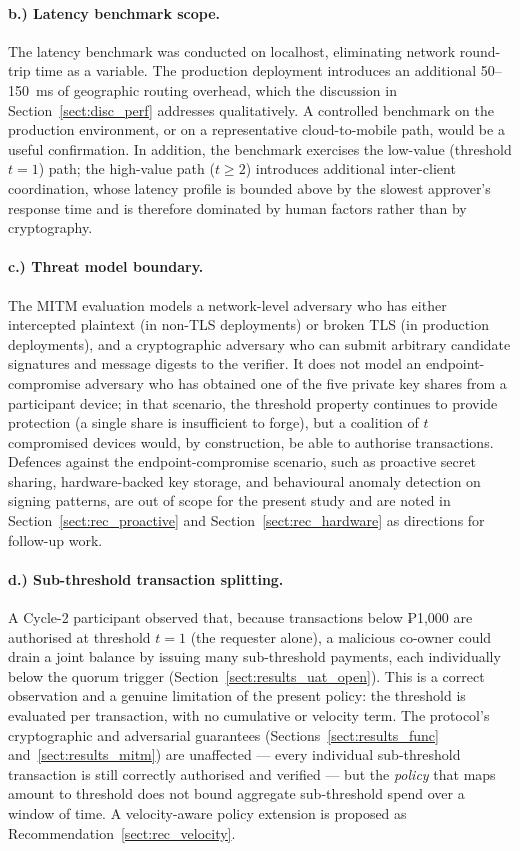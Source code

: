 \paragraph{b.) Latency benchmark scope.}
The latency benchmark was conducted on localhost, eliminating network round-trip time as a variable. The production deployment introduces an additional 50--150~ms of geographic routing overhead, which the discussion in Section~\ref{sect:disc_perf} addresses qualitatively. A controlled benchmark on the production environment, or on a representative cloud-to-mobile path, would be a useful confirmation. In addition, the benchmark exercises the low-value (threshold $t = 1$) path; the high-value path ($t \geq 2$) introduces additional inter-client coordination, whose latency profile is bounded above by the slowest approver's response time and is therefore dominated by human factors rather than by cryptography.

\paragraph{c.) Threat model boundary.}
The MITM evaluation models a network-level adversary who has either intercepted plaintext (in non-TLS deployments) or broken TLS (in production deployments), and a cryptographic adversary who can submit arbitrary candidate signatures and message digests to the verifier. It does not model an endpoint-compromise adversary who has obtained one of the five private key shares from a participant device; in that scenario, the threshold property continues to provide protection (a single share is insufficient to forge), but a coalition of $t$ compromised devices would, by construction, be able to authorise transactions. Defences against the endpoint-compromise scenario, such as proactive secret sharing, hardware-backed key storage, and behavioural anomaly detection on signing patterns, are out of scope for the present study and are noted in Section~\ref{sect:rec_proactive} and Section~\ref{sect:rec_hardware} as directions for follow-up work.

\paragraph{d.) Sub-threshold transaction splitting.}
A Cycle-2 participant observed that, because transactions below ₱1{,}000 are authorised at threshold $t = 1$ (the requester alone), a malicious co-owner could drain a joint balance by issuing many sub-threshold payments, each individually below the quorum trigger (Section~\ref{sect:results_uat_open}). This is a correct observation and a genuine limitation of the present policy: the threshold is evaluated per transaction, with no cumulative or velocity term. The protocol's cryptographic and adversarial guarantees (Sections~\ref{sect:results_func} and~\ref{sect:results_mitm}) are unaffected --- every individual sub-threshold transaction is still correctly authorised and verified --- but the \textit{policy} that maps amount to threshold does not bound aggregate sub-threshold spend over a window of time. A velocity-aware policy extension is proposed as Recommendation~\ref{sect:rec_velocity}.
